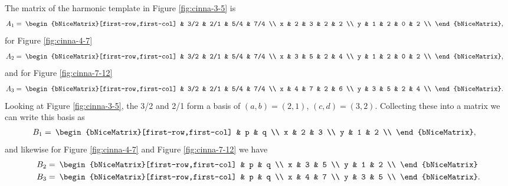 \documentclass[a4paper,11pt]{article}
\newcommand\matspace{\:}
\begin{document}
The matrix of the harmonic template in Figure \ref{fig:cinna-3-5} is
\begin{align}
A_1 &=\matspace
\begin{bNiceMatrix}[first-row,first-col]
    &   3/2 &   2/1 &   5/4 &   7/4 \\
x   &   2   &   3   &   2   &   2   \\
y   &   1   &   2   &   0   &   2   \\
\end{bNiceMatrix},
\end{align}
for Figure \ref{fig:cinna-4-7}
\begin{align}
A_2 &=\matspace
\begin{bNiceMatrix}[first-row,first-col]
    &   3/2 &   2/1 &   5/4 &   7/4 \\
x   &   3   &   5   &   2   &   4   \\
y   &   1   &   2   &   0   &   2   \\
\end{bNiceMatrix},
\end{align}
and for Figure \ref{fig:cinna-7-12}
\begin{align}
A_3 &=\matspace
\begin{bNiceMatrix}[first-row,first-col]
    &   3/2 &   2/1 &   5/4 &   7/4 \\
x   &   4   &   7   &   2   &   6   \\
y   &   3   &   5   &   2   &   4   \\
\end{bNiceMatrix}.
\end{align}
Looking at Figure \ref{fig:cinna-3-5}, the 3/2 and 2/1 form a basis of $(a, b)
= (2, 1)$, $(c, d) = (3, 2)$. Collecting these into a matrix we can write this
basis as
\begin{align}
B_1 &=\matspace
\begin{bNiceMatrix}[first-row,first-col]
    &   p   &   q   \\
x   &   2   &   3   \\
y   &   1   &   2   \\
\end{bNiceMatrix},
\end{align}
and likewise for Figure \ref{fig:cinna-4-7} and Figure \ref{fig:cinna-7-12} we
have
\begin{align}
B_2 &=\matspace
\begin{bNiceMatrix}[first-row,first-col]
    &   p   &   q   \\
x   &   3   &   5   \\
y   &   1   &   2   \\
\end{bNiceMatrix} \\
B_3 &=\matspace
\begin{bNiceMatrix}[first-row,first-col]
    &   p   &   q   \\
x   &   4   &   7   \\
y   &   3   &   5   \\
\end{bNiceMatrix}.
\end{align}
\end{document}
